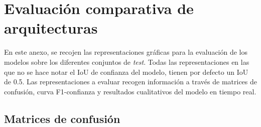 \documentclass[12pt,a4paper,onecolumn,oneside]{report}
\begin{document}
\chapter{Evaluación comparativa de arquitecturas} %
\label{Evaluación comparativa de arquitecturas}

En este anexo, se recojen las representaciones gráficas para la evaluación de los modelos sobre los diferentes conjuntos de \textit{test}. Todas las representaciones en las que no se hace notar el IoU
de confianza del modelo, tienen por defecto un IoU de 0.5. Las representaciones a evaluar recogen información a través de matrices de confusión, curva F1-confianza y resultados cualitativos del modelo en tiempo real.

\section{Matrices de confusión}
\label{sec:Matrice de confusión}
\end{document}
